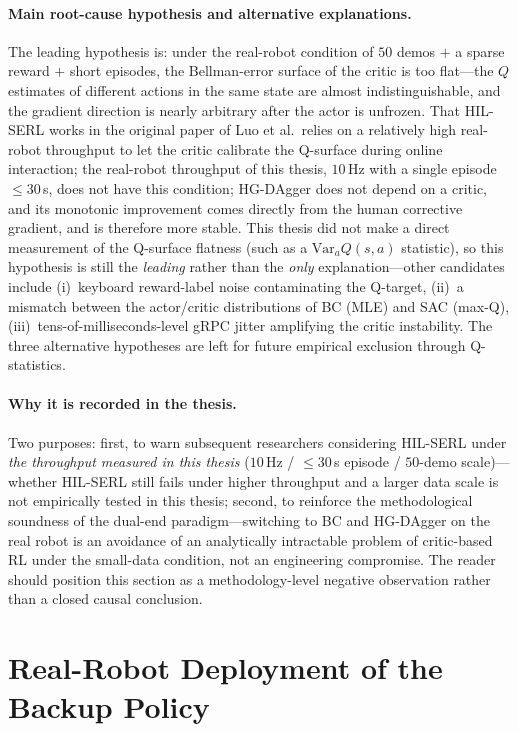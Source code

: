 \paragraph{Main root-cause hypothesis and alternative explanations.} The leading hypothesis is: under the real-robot condition of $50$ demos $+$ a sparse reward $+$ short episodes, the Bellman-error surface of the critic is too flat---the $Q$ estimates of different actions in the same state are almost indistinguishable, and the gradient direction is nearly arbitrary after the actor is unfrozen. That HIL-SERL works in the original paper of Luo et al.\ relies on a relatively high real-robot throughput to let the critic calibrate the Q-surface during online interaction; the real-robot throughput of this thesis, $10$\,Hz with a single episode $\le 30$\,s, does not have this condition; HG-DAgger does not depend on a critic, and its monotonic improvement comes directly from the human corrective gradient, and is therefore more stable. This thesis did not make a direct measurement of the Q-surface flatness (such as a $\text{Var}_a Q(s, a)$ statistic), so this hypothesis is still the \emph{leading} rather than the \emph{only} explanation---other candidates include (i)~keyboard reward-label noise contaminating the Q-target, (ii)~a mismatch between the actor/critic distributions of BC (MLE) and SAC (max-Q), (iii)~tens-of-milliseconds-level gRPC jitter amplifying the critic instability. The three alternative hypotheses are left for future empirical exclusion through Q-statistics.

\paragraph{Why it is recorded in the thesis.} Two purposes: first, to warn subsequent researchers considering HIL-SERL under \emph{the throughput measured in this thesis} ($10$\,Hz / $\le 30$\,s episode / $50$-demo scale)---whether HIL-SERL still fails under higher throughput and a larger data scale is not empirically tested in this thesis; second, to reinforce the methodological soundness of the dual-end paradigm---switching to BC and HG-DAgger on the real robot is an avoidance of an analytically intractable problem of critic-based RL under the small-data condition, not an engineering compromise. The reader should position this section as a methodology-level negative observation rather than a closed causal conclusion.

\section{Real-Robot Deployment of the Backup Policy}\label{sec:backup_real_deploy}

